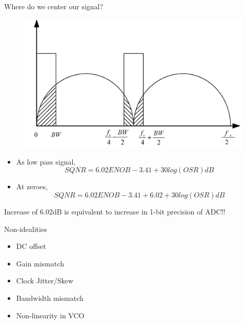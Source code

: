 \documentclass{beamer}
\begin{document}
\begin{frame}{Where do we center our signal?}
\begin{figure}
	\includegraphics[scale=0.2]{./figs/Bwplot.png}
\end{figure}
\pause
\vspace{-0.5cm}
\begin{itemize}
	\item As low pass signal,
	\vspace{-0.5cm}
	\begin{equation*}
		SQNR = 6.02ENOB - 3.41 + 30log(OSR)dB
	\end{equation*}
	\vspace{-1cm}
	\pause
	\item At zeroes,
	\vspace{-0.6cm}
	\begin{equation*}
		SQNR = 6.02ENOB - 3.41 + 6.02 + 30log(OSR)dB
	\end{equation*}
	\vspace{-1cm}
\end{itemize}
	\pause
	Increase of 6.02dB is equivalent to increase in 1-bit precision of ADC!!
\end{frame}

\begin{frame}{Non-idealities}
	\begin{itemize}
		\item DC offset
		\item Gain mismatch
		\item Clock Jitter/Skew
		\item Bandwidth mismatch
		\item Non-linearity in VCO
	\end{itemize}
\end{frame}
\end{document}
